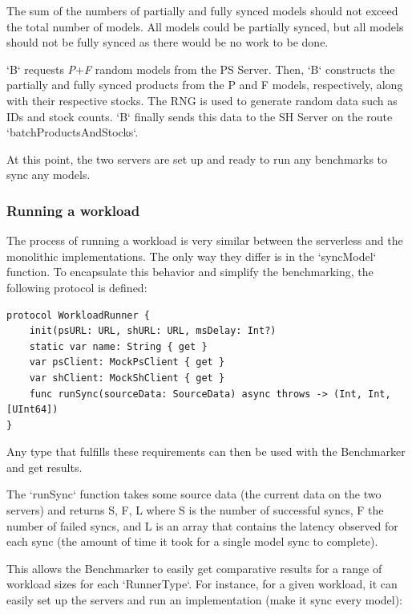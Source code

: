 The sum of the numbers of partially and fully synced models should not exceed the total number of models. All models could be partially synced, but all models should not be fully synced as there would be no work to be done.

`B` requests \textit{P}+\textit{F} random models from the PS Server. Then, `B` constructs the partially and fully synced products from the P and F models, respectively, along with their respective stocks. The RNG is used to generate random data such as IDs and stock counts. `B` finally sends this data to the SH Server on the route `batchProductsAndStocks`.

At this point, the two servers are set up and ready to run any benchmarks to sync any models.

\subsubsection{Running a workload}

The process of running a workload is very similar between the serverless and the monolithic implementations. The only way they differ is in the `syncModel` function. To encapsulate this behavior and simplify the benchmarking, the following protocol is defined:

\begin{verbatim}
protocol WorkloadRunner {
    init(psURL: URL, shURL: URL, msDelay: Int?)
    static var name: String { get }
    var psClient: MockPsClient { get }
    var shClient: MockShClient { get }
    func runSync(sourceData: SourceData) async throws -> (Int, Int, [UInt64])
}
\end{verbatim}

Any type that fulfills these requirements can then be used with the Benchmarker and get results.

The `runSync` function takes some source data (the current data on the two servers) and returns S, F, L where S is the number of successful syncs, F the number of failed syncs, and L is an array that contains the latency observed for each sync (the amount of time it took for a single model sync to complete).

This allows the Benchmarker to easily get comparative results for a range of workload sizes for each `RunnerType`. For instance, for a given workload, it can easily set up the servers and run an implementation (make it sync every model):

